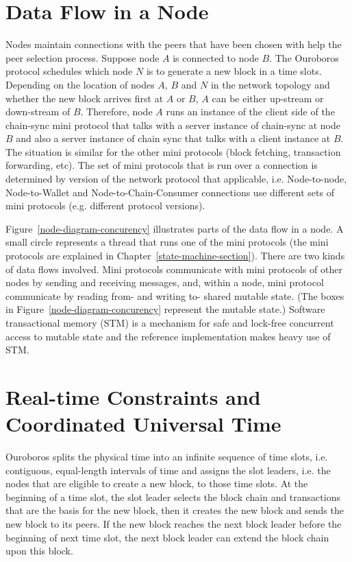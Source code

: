 \documentclass{report}
\theoremstyle{definition}{
  \newtheorem{lemma}{Lemma}[section] %
  \newtheorem{definition}[lemma]{Definition}
}
\theoremstyle{theorem}{
  \newtheorem{invariant}[lemma]{Invariant}
  \newtheorem{proofobligation}[lemma]{Proof Obligation}
}
\numberwithin{equation}{lemma}
\begin{document}
\section{Data Flow in a Node}
Nodes maintain connections with the peers that have been chosen with help the peer selection process.
Suppose node $A$ is connected to node $B$.
The Ouroboros protocol schedules which node $N$ is to generate a new block in a time slots.
Depending on the location of nodes $A$, $B$ and $N$ in the network topology and whether the new
block arrives first at $A$ or $B$, $A$ can be either up-stream or down-stream of $B$.
Therefore, node $A$ runs an instance of the client side of the chain-sync mini protocol
that talks with a server instance of chain-sync at node $B$ and also a server instance of chain sync
that talks with a client instance at $B$.
The situation is similar for the other mini protocols (block fetching, transaction forwarding, etc).
The set of mini protocols that is run over a connection is determined by version of the network
protocol that applicable, i.e.
Node-to-node, Node-to-Wallet and Node-to-Chain-Consumer connections use different sets of mini protocols
(e.g. different protocol versions).

Figure~\ref{node-diagram-concurency} illustrates parts of the data flow in a node.
A small circle represents a thread that runs one of the mini protocols (the mini protocols are explained in
Chapter~\ref{state-machine-section}).
There are two kinds of data flows involved.
Mini protocols communicate with mini protocols of other nodes by sending and receiving messages,
and, within a node, mini protocol communicate by reading from- and writing to- shared mutable state.
(The boxes in Figure~\ref{node-diagram-concurency} represent the mutable state.)
Software transactional memory (STM) is a mechanism for safe and lock-free concurrent
access to mutable state and the reference implementation makes heavy use of STM.

\section{Real-time Constraints and Coordinated Universal Time}
Ouroboros splits the physical time into an infinite sequence of time slots,
i.e. contiguous, equal-length intervals of time
and assigns the slot leaders, i.e. the nodes that are eligible to create a new block, to those time slots.
At the beginning of a time slot, the slot leader selects the block chain and transactions that are the basis
for the new block, then it creates the new block and sends the new block to its peers.
If the new block reaches the next block leader before the beginning of next time slot,
the next block leader can extend the block chain upon this block.
\end{document}
